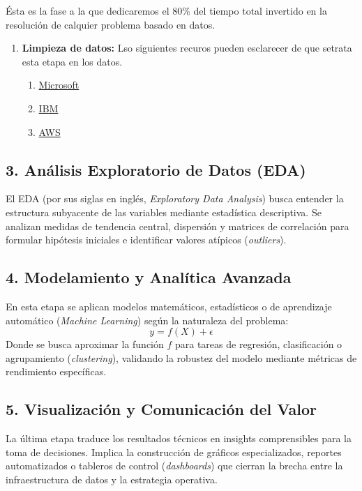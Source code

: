 Ésta es la fase a la que dedicaremos el 80\% del tiempo total invertido en 
la resolución de calquier problema basado en datos.

\begin{enumerate}
    \item \textbf{Limpieza de datos:} Lso siguientes recuros pueden esclarecer de que setrata esta etapa en los datos.

    \begin{enumerate}
        \item \href{https://support.microsoft.com/en-us/office/top-ten-ways-to-clean-your-data-2844b620-6f7c-47a7-acfe-c11927a07ped}{Microsoft}
        \item \href{https://www.ibm.com/mx-es/think/topics/data-cleaning}{IBM}
        \item \href{https://aws.amazon.com/es/what-is/data-cleansing/}{AWS}
    \end{enumerate}
\end{enumerate}

\subsection{3. Análisis Exploratorio de Datos (EDA)}
El EDA (por sus siglas en inglés, \textit{Exploratory Data Analysis}) busca entender la estructura subyacente de las variables mediante estadística descriptiva. Se analizan medidas de tendencia central, dispersión y matrices de correlación para formular hipótesis iniciales e identificar valores atípicos (\textit{outliers}).

\subsection{4. Modelamiento y Analítica Avanzada}
En esta etapa se aplican modelos matemáticos, estadísticos o de aprendizaje automático (\textit{Machine Learning}) según la naturaleza del problema:
\begin{equation}
    y = f(X) + \epsilon
\end{equation}
Donde se busca aproximar la función $f$ para tareas de regresión, clasificación o agrupamiento (\textit{clustering}), validando la robustez del modelo mediante métricas de rendimiento específicas.

\subsection{5. Visualización y Comunicación del Valor}
La última etapa traduce los resultados técnicos en insights comprensibles para la toma de decisiones. Implica la construcción de gráficos especializados, reportes automatizados o tableros de control (\textit{dashboards}) que cierran la brecha entre la infraestructura de datos y la estrategia operativa.